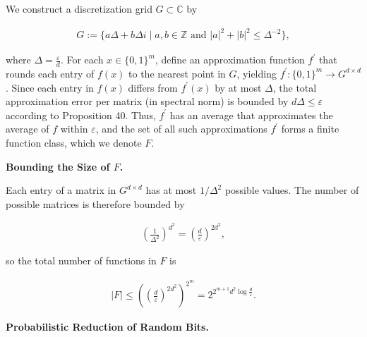 \documentclass[10pt,a4paper]{article}
\begin{document}
We construct a discretization grid $G\subset\mathbb{C}$ by\par


\[\begin{gathered}
G:=\{a\Delta+b\Delta i\mid a,b\in\mathbb{Z}\text{ and }\left|a\right|^{2}+\left|b\right|^{2}\leq\Delta^{-2}\},
\end{gathered}\]


where $\Delta=\frac{\varepsilon}{d}$.
For each $x\in\{0,1\}^{m}$, define an approximation function $f^{\prime}$ that rounds each entry of $f(x)$ to the nearest point in $G$, yielding $f^{\prime}:\{0,1\}^{m}\to G^{d\times d}$. Since each entry in $f(x)$ differs from $f^{\prime}(x)$ by at most $\Delta$, the total approximation error per matrix (in spectral norm) is bounded by $d\Delta\leq\varepsilon$ according to Proposition 40. Thus, $f^{\prime}$ has an average that approximates the average of $f$ within $\varepsilon$, and the set of all such approximations $f^{\prime}$ forms a finite function class, which we denote $F$.\par





\par\medskip\noindent\textbf{Bounding the Size of $F$.}\par




Each entry of a matrix in $G^{d\times d}$ has at most $1/\Delta^{2}$
possible values. The number of possible matrices is therefore bounded by\par


\[\begin{gathered}
\left(\frac{1}{\Delta^{2}}\right)^{d^{2}}=\left(\frac{d}{\varepsilon}\right)^{2d^{2}},
\end{gathered}\]


so the total number of functions in $F$ is\par


\[\begin{gathered}
\left|F\right|\leq\left(\left(\frac{d}{\varepsilon}\right)^{2d^{2}}\right)^{2^{m}}=2^{2^{m+1}d^{2}\log\frac{d}{\varepsilon}}.
\end{gathered}\]





\par\medskip\noindent\textbf{Probabilistic Reduction of Random Bits.}\par
\end{document}

